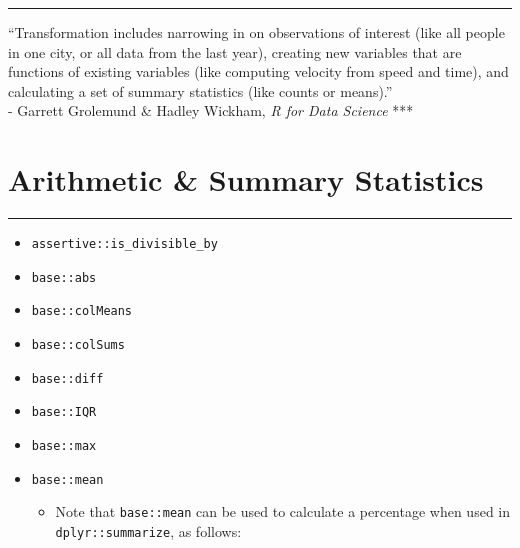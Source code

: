 \documentclass[
]{book}
\newenvironment{Shaded}{\begin{snugshade}}{\end{snugshade}}
\newcommand{\DataTypeTok}[1]{\textcolor[rgb]{0.13,0.29,0.53}{#1}}
\newcommand{\DecValTok}[1]{\textcolor[rgb]{0.00,0.00,0.81}{#1}}
\newcommand{\KeywordTok}[1]{\textcolor[rgb]{0.13,0.29,0.53}{\textbf{#1}}}
\newcommand{\NormalTok}[1]{#1}
\newcommand{\OperatorTok}[1]{\textcolor[rgb]{0.81,0.36,0.00}{\textbf{#1}}}
\newcommand{\StringTok}[1]{\textcolor[rgb]{0.31,0.60,0.02}{#1}}
\providecommand{\tightlist}{%
  \setlength{\itemsep}{0pt}\setlength{\parskip}{0pt}}
\begin{document}
\begin{center}\rule{0.5\linewidth}{0.5pt}\end{center}

``Transformation includes narrowing in on observations of interest (like all people in one city, or all data from the last year), creating new variables that are functions of existing variables (like computing velocity from speed and time), and calculating a set of summary statistics (like counts or means).''\\
- Garrett Grolemund \& Hadley Wickham, \emph{R for Data Science}
***

\hypertarget{arithmetic-summary-statistics}{%
\section{Arithmetic \& Summary Statistics}\label{arithmetic-summary-statistics}}

\begin{center}\rule{0.5\linewidth}{0.5pt}\end{center}

\begin{itemize}
\tightlist
\item
  \texttt{assertive::is\_divisible\_by}
\item
  \texttt{base::abs}
\item
  \texttt{base::colMeans}
\item
  \texttt{base::colSums}
\item
  \texttt{base::diff}
\item
  \texttt{base::IQR}
\item
  \texttt{base::max}
\item
  \texttt{base::mean}

  \begin{itemize}
  \tightlist
  \item
    Note that \texttt{base::mean} can be used to calculate a percentage when used in \texttt{dplyr::summarize}, as follows:
  \end{itemize}
\end{itemize}

\begin{Shaded}
\end{Shaded}
\end{document}
